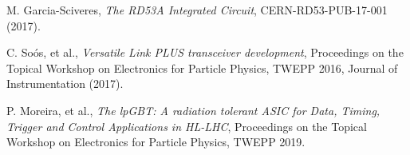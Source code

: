 \documentclass[a4paper,11pt]{article}
\begin{document}
\begin{thebibliography}{99}
%

M. Garcia-Sciveres, \emph{The RD53A Integrated Circuit},
CERN-RD53-PUB-17-001 (2017).

%

C. So{\'{o}}s, et al., \emph{Versatile Link {PLUS} transceiver development},
Proceedings on the Topical Workshop on Electronics for Particle Physics, TWEPP 2016,
Journal of Instrumentation (2017).


P. Moreira, et al., \emph{The lpGBT: A radiation tolerant ASIC for Data, Timing, Trigger and Control Applications in HL-LHC},
Proceedings on the Topical Workshop on Electronics for Particle Physics, TWEPP 2019.


\end{thebibliography}
\end{document}

